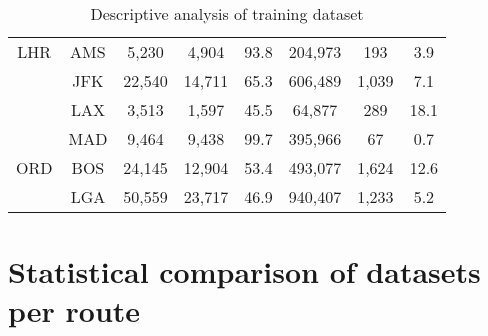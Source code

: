 \begin{table}[h]
\begin{tabular}{c c | c c c | c | c c}
LHR  &  AMS  &   5,230  &   4,904  &  93.8  &  204,973  &    193  &   3.9 \\
~    &  JFK  &  22,540  &  14,711  &  65.3  &  606,489  &  1,039  &   7.1 \\
~    &  LAX  &   3,513  &   1,597  &  45.5  &   64,877  &    289  &  18.1 \\
~    &  MAD  &   9,464  &   9,438  &  99.7  &  395,966  &     67  &   0.7 \\[.5ex]
ORD  &  BOS  &  24,145  &  12,904  &  53.4  &  493,077  &  1,624  &  12.6 \\
~    &  LGA  &  50,559  &  23,717  &  46.9  &  940,407  &  1,233  &   5.2 \\
\bottomrule
\end{tabular}
\caption{Descriptive analysis of training dataset}
\label{tbl:DescriptiveAnalysisTrainingDataset}
\end{table}



\chapter{Statistical comparison of datasets per route}
\label{app:StatisticalComparisonDatasets}

